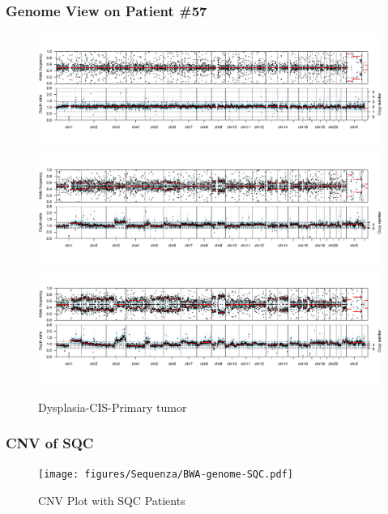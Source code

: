 \documentclass{beamer}
\begin{document}
    \begin{frame}
        \frametitle{Genome View on Patient \#57}

        \begin{figure}
            \includegraphics[width=\linewidth]{figures/Sequenza/57D1.pdf}
            \includegraphics[width=\linewidth]{figures/Sequenza/57C1.pdf}
            \includegraphics[width=\linewidth]{figures/Sequenza/57P1.pdf}
            \caption{Dysplasia-CIS-Primary tumor}
        \end{figure}
    \end{frame}

    \begin{frame}
        \frametitle{CNV of SQC}

        \begin{figure}
            \texttt{[image: figures/Sequenza/BWA-genome-SQC.pdf]}
            \caption{CNV Plot with SQC Patients}
        \end{figure}
    \end{frame}
\end{document}
